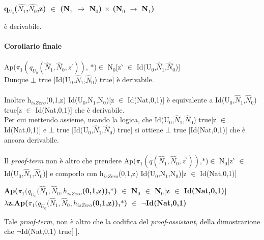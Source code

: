 \normalsize
\begin{center}\textbf{q$_{U_0}$($\hat{N_1}$,$\hat{N_0}$,z) $\in$ (N$_1$ $\rightarrow$ N$_0$) $\times$ (N$_0$ $\rightarrow$ N$_1$)}\end{center} \`e derivabile.
\\\\
\noindent
\textbf{Corollario finale}\\\\
\noindent
Ap($\pi_1 (q_{U_0}(\hat{N}_1,\hat{N}_0,z^\backprime))$, $\ast$)$\in$ N$_0$[z$\backprime$ $\in$ Id(U$_0$,$\hat{N}_1$,$\hat{N}_0$)]\\
Dunque $\bot$ true [Id(U$_0$,$\hat{N}_1$,$\hat{N}_0$) true] \`e derivabile.\\\\
\noindent
Inoltre h$_{isZero}$(0,1,z) Id(U$_0$,N$_1$,N$_0$)[z $\in$ Id(Nat,0,1)] \`e equivalente a Id(U$_0$,$\hat{N}_1$,$\hat{N}_0$) true[z $\in$ Id(Nat,0,1)] che  \`e derivabile.\\
Per cui mettendo assieme, usando la logica, che Id(U$_0$,$\hat{N}_1$,$\hat{N}_0$) true[z $\in$ Id(Nat,0,1)]  e $\bot$ true [Id(U$_0$,$\hat{N}_1$,$\hat{N}_0$) true] si ottiene $\bot$ true [Id(Nat,0,1)] che \`e ancora derivabile.\\\\
\noindent 
Il \textit{proof-term} non \`e altro che prendere Ap($\pi_1 (q(\hat{N}_1,\hat{N}_0,z^\backprime))$,$\ast$)$\in$ N$_0$[z$\backprime$ $\in$ Id(U$_0$,$\hat{N}_1$,$\hat{N}_0$)] e comporlo con h$_{isZero}$(0,1,z) Id(U$_0$,N$_1$,N$_0$)[z $\in$ Id(Nat,0,1)]
\begin{center}\textbf{Ap($\pi_1 (q_{U_0}(\hat{N}_1,\hat{N}_0,h_{isZero}$(0,1,z)),$\ast$) $\in$ N$_0$ $\in$ N$_0$[z $\in$ Id(Nat,0,1)]} \\ \textbf{$\lambda$z.Ap($\pi_1 (q_{U_0}(\hat{N}_1,\hat{N}_0,h_{isZero}$(0,1,z)),$\ast$) $\in$ $\neg$Id(Nat,0,1) }\end{center}
\noindent
Tale \textit{proof-term}, non \`e altro che la codifica del \textit{proof-assistant}, della dimostrazione che $\neg$Id(Nat,0,1) true[ ].

